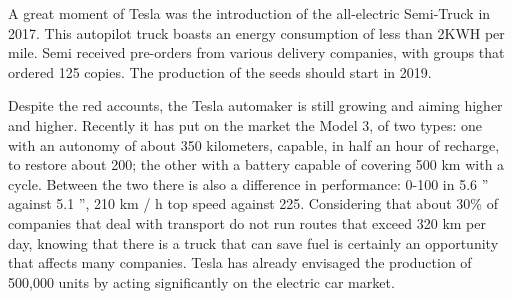 A great moment of Tesla was the introduction of the all-electric Semi-Truck in 2017. This autopilot truck boasts an energy consumption of less than 2KWH per mile. Semi received pre-orders from various delivery companies, with groups that ordered 125 copies. The production of the seeds should start in 2019.

Despite the red accounts, the Tesla automaker is still growing and aiming higher and higher. Recently it has put on the market the Model 3, of two types: one with an autonomy of about 350 kilometers, capable, in half an hour of recharge, to restore about 200; the other with a battery capable of covering 500 km with a cycle. Between the two there is also a difference in performance: 0-100 in 5.6 '' against 5.1 '', 210 km / h top speed against 225. Considering that about 30\% of companies that deal with transport do not run routes that exceed 320 km per day, knowing that there is a truck that can save fuel is certainly an opportunity that affects many companies. Tesla has already envisaged the production of 500,000 units by acting significantly on the electric car market.